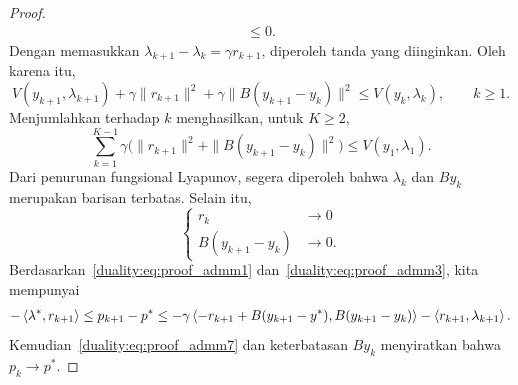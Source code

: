 \begin{proof}
\begin{equation}
\begin{aligned}
            \leq 0.
        \end{aligned}
    \end{equation}
    Dengan memasukkan $\lambda_{k+1}-\lambda_k = \gamma r_{k+1}$, diperoleh tanda yang diinginkan. Oleh karena itu,
    \begin{equation}
        V(y_{k+1},\lambda_{k+1}) + \gamma\|r_{k+1}\|^2 + \gamma\|B(y_{k+1}-y_k)\|^2 \leq V(y_{k},\lambda_{k}),\qquad k\geq1.
    \end{equation}
    Menjumlahkan terhadap $k$ menghasilkan, untuk $K\geq2$,
    \begin{equation}
        \sum_{k=1}^{K-1}\gamma\big(\|r_{k+1}\|^2 + \|B(y_{k+1}-y_k)\|^2\big) \leq V(y_{1},\lambda_{1}).
    \end{equation}
    Dari penurunan fungsional Lyapunov, segera diperoleh bahwa $\lambda_k$ dan $By_k$ merupakan barisan terbatas.
    Selain itu,
    \begin{equation}\label{duality:eq:proof_admm7}
        \begin{cases}
            r_k&\rightarrow 0\\
            B(y_{k+1}-y_k)&\rightarrow 0.
        \end{cases}
    \end{equation}
    Berdasarkan~\eqref{duality:eq:proof_admm1} dan~\eqref{duality:eq:proof_admm3}, kita mempunyai
    \begin{equation}
        \begin{aligned}
            -\left\langle\lambda^* , r_{k+1}\right\rangle\leq p_{k+1}-p^*\leq -\gamma\left\langle-r_{k+1} + B(y_{k+1}-y^*) , B(y_{k+1}-y_k)\right\rangle - \left\langle r_{k+1} , \lambda_{k+1}\right\rangle.
        \end{aligned}
    \end{equation}
    Kemudian~\eqref{duality:eq:proof_admm7} dan keterbatasan $By_k$ menyiratkan bahwa $p_{k}\rightarrow p^*$.
\end{proof}
